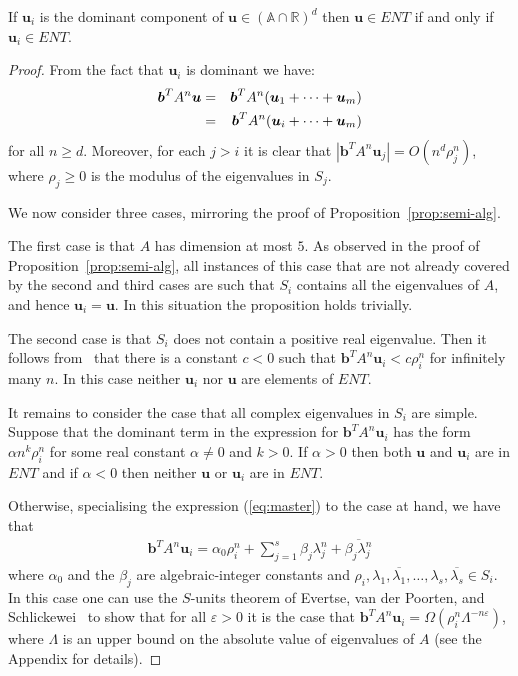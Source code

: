 \begin{proposition}
  If $\boldsymbol{u}_i$ is the dominant component of $\boldsymbol{u}
  \in (\mathbb{A}\cap\mathbb{R})^d$ then $\boldsymbol{u}\in\mathit{ENT}$ if and only
if $\boldsymbol{u}_i \in \mathit{ENT}$.
\label{prop:dominant}
\end{proposition}
\begin{proof}
From the fact that $\boldsymbol{u}_i$ is dominant we have:
\begin{eqnarray}
 \boldsymbol{b}^TA^n\boldsymbol{u}&=&
   \boldsymbol{b}^TA^n(\boldsymbol{u}_1+\cdots+\boldsymbol{u}_m) \notag\\
&=&\boldsymbol{b}^TA^n(\boldsymbol{u}_i+\cdots+\boldsymbol{u}_m)
\label{eq:part}
\end{eqnarray}
for all $n\geq d$.  Moreover, for each $j>i$ it is clear that
  $|\boldsymbol{b}^TA^n\boldsymbol{u}_j| = O(n^d\rho_j^n)$, where
  $\rho_j\geq 0$ is the modulus of the eigenvalues in $S_j$.

  We now consider three cases, mirroring the proof of
  Proposition~\ref{prop:semi-alg}.

  The first case is that $A$ has dimension at most $5$.  As observed
  in the proof of Proposition~\ref{prop:semi-alg}, all instances of
  this case that are not already covered by the second and third cases
  are such that $S_i$ contains all the eigenvalues of $A$, and hence
  $\boldsymbol{u}_i=\boldsymbol{u}$.  In this situation the proposition
  holds trivially.

  The second case is that $S_i$ does not contain a positive real
  eigenvalue.  Then it follows from~\cite[Lemma 4]{Bra06} that there
  is a constant $c<0$ such that
  $\boldsymbol{b}^TA^n\boldsymbol{u}_i<c\rho_i^n$ for infinitely many
  $n$.  In this case neither $\boldsymbol{u}_i$ nor $\boldsymbol{u}$
  are elements of $\mathit{ENT}$.

  It remains to consider the case that all complex eigenvalues in
  $S_i$ are simple.  Suppose that the dominant term in the expression
  for $\boldsymbol{b}^TA^n\boldsymbol{u}_i$ has the form $\alpha
  n^k\rho_i^n$ for some real constant $\alpha\neq 0$ and $k>0$.  If
  $\alpha>0$ then both $\boldsymbol{u}$ and $\boldsymbol{u}_i$ are in
  $\mathit{ENT}$ and if $\alpha<0$ then neither $\boldsymbol{u}$ or
  $\boldsymbol{u}_i$ are in $\mathit{ENT}$.

  Otherwise, specialising the expression (\ref{eq:master}) to the case
  at hand, we have that
\begin{gather}
\label{eq:diag}
 \boldsymbol{b}^TA^n\boldsymbol{u}_i = \alpha_0 \rho_i^n+\sum\limits_{j=1}^s\beta_j\lambda_j^n+\overline{\beta_j\lambda_j^n}
\end{gather}
where $\alpha_0$ and the $\beta_j$ are algebraic-integer constants and
$\rho_i,\lambda_1,\overline{\lambda_1},\ldots,\lambda_s,\overline{\lambda_s} \in S_i$.  In this case one can use the
$S$-units theorem of Evertse, van der Poorten, and
Schlickewei~\cite{Evertse84,PS82} to show that for all $\varepsilon>0$ it
is the case that $\boldsymbol{b}^TA^n\boldsymbol{u}_i =\Omega\left(
  \rho_i^n \Lambda^{-n\varepsilon} \right)$,
where $\Lambda$ is an upper bound on the absolute value of eigenvalues of $A$ (see the Appendix for details).


\end{proof}
